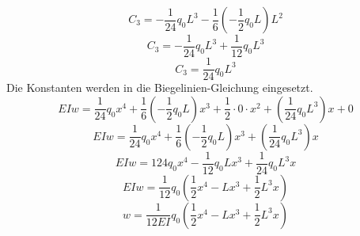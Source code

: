\begin{equation}
	C_3=
	-\frac{1}{24}q_0L^3-\frac{1}{6}\left(-\frac{1}{2}q_0L\right)L^2
\end{equation}
\begin{equation}
	C_3=
	-\frac{1}{24}q_0L^3+\frac{1}{12}q_0L^3
\end{equation}
\begin{equation}
	C_3=
	\frac{1}{24}q_0L^3
\end{equation}
Die Konstanten werden in die Biegelinien-Gleichung eingesetzt.
\begin{equation}
	EIw=
	\frac{1}{24}q_0x^4+\frac{1}{6}\left(-\frac{1}{2}q_0L\right)x^3+\frac{1}{2}\cdot0\cdot x^2+\left(\frac{1}{24}q_0L^3\right)x+0
\end{equation}
\begin{equation}
	EIw=
	\frac{1}{24}q_0x^4+\frac{1}{6}\left(-\frac{1}{2}q_0L\right)x^3+\left(\frac{1}{24}q_0L^3\right)x
\end{equation}
\begin{equation}
	EIw=
	{1}{24}q_0x^4-\frac{1}{12}q_0Lx^3+\frac{1}{24}q_0L^3x
\end{equation}
\begin{equation}
	EIw=
	\frac{1}{12}q_0\left(\frac{1}{2}x^4-Lx^3+\frac{1}{2}L^3x\right)
\end{equation}
\begin{equation}
	w=
	\frac{1}{12EI}q_0\left(\frac{1}{2}x^4-Lx^3+\frac{1}{2}L^3x\right)
\end{equation}

